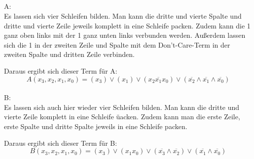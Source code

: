 \documentclass[10pt,a4paper,oneside,ngerman,numbers=noenddot]{scrartcl}
\begin{document}
\begin{figure}[h]
\end{figure}
\subsection{} %
A:\\
Es lassen sich vier Schleifen bilden. Man kann die dritte und vierte Spalte und dritte und vierte Zeile jeweils komplett in eine Schleife packen. Zudem kann die 1 ganz oben links mit der 1 ganz unten links verbunden werden. Außerdem lassen sich die 1 in der zweiten Zeile und Spalte mit dem Don't-Care-Term in der zweiten Spalte und dritten Zeile verbinden.

Daraus ergibt sich dieser Term für A:
\begin{equation*}
A(x_{3},x_{2},x_{1},x_{0}) = (x_{3}) \vee (x_{1}) \vee (x_{2}\overline{x_{1}}x_{0}) \vee (\overline{x_{2}} \wedge \overline{x_{1}} \wedge \overline{x_{0}})
\end{equation*}
\\
B:\\
Es lassen sich auch hier wieder vier Schleifen bilden. Man kann die dritte und vierte Zeile komplett in eine Schleife üacken. Zudem kann man die erste Zeile, erste Spalte und dritte Spalte jeweils in eine Schleife packen.

Daraus ergibt sich dieser Term für B:
\begin{equation*}
B(x_{3},x_{2},x_{1},x_{0}) = (x_{3}) \vee (x_{1}x_{0}) \vee (\overline{x_{3}} \wedge \overline{x_{2}}) \vee (\overline{x_{1}} \wedge \overline{x_{0}})
\end{equation*}
\section{} %
\end{document}
